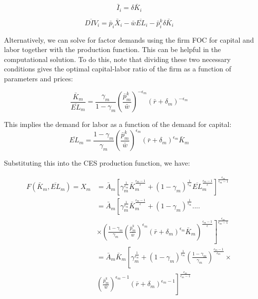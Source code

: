 \documentclass[letterpaper,12pt]{article}
\theoremstyle{definition}
\begin{document}
\begin{spacing}{1.5}
\begin{equation}
\label{eqn:i_ss2}
\bar{I}_{i} = \delta \bar{K}_{i}
\end{equation}

\begin{equation}
\label{eqn:div_ss}
\overline{DIV}_{i} = \bar{p}_{i}\bar{X}_{i}-\bar{w}\overline{EL}_{i}-\bar{p}^{k}_{i}\delta \bar{K}_{i}
\end{equation}


Alternatively, we can solve for factor demands using the firm FOC for capital and labor together with the production function.  This can be helpful in the computational solution.  To do this, note that dividing these two necessary conditions gives the optimal capital-labor ratio of the firm as a function of parameters and prices:

\begin{equation}
\frac{\bar{K}_{m}}{\overline{EL}_{m}} = \frac{\gamma_{m}}{1-\gamma_{m}}\left(\frac{\bar{p}^{k}_{m}}{\bar{w}} \right)^{-\epsilon_{m}}\left( \bar{r}+ \delta_{m}\right)^{-\epsilon_{m}}
\end{equation}

This implies the demand for labor as a function of the demand for capital:
\begin{equation}
\label{eqn:l_demand_dyn_ss}
\overline{EL}_{m} = \frac{1-\gamma_{m}}{\gamma_{m}}\left(\frac{\bar{p}^{k}_{m}}{\bar{w}} \right)^{\epsilon_{m}}\left( \bar{r}+ \delta_{m}\right)^{\epsilon_{m}}\bar{K}_{m}
\end{equation}

Substituting this into the CES production function, we have:

\begin{equation}
\begin{split}
F(\bar{K}_{m},\overline{EL}_{m})=X_{m} & = \bar{A}_{m}\left[\gamma_{m}^{\frac{1}{\epsilon_{m}}}\bar{K}_{m}^{\frac{\epsilon_{m}-1}{\epsilon}} + (1-\gamma_{m})^{\frac{1}{\epsilon_{m}}}\overline{EL}_{m}^{\frac{\epsilon_{m}-1}{\epsilon}} \right]^{\frac{\epsilon_{m}}{\epsilon_{m}-1}} \\
& = \bar{A}_{m}\left[\gamma_{m}^{\frac{1}{\epsilon_{m}}}\bar{K}_{m}^{\frac{\epsilon_{m}-1}{\epsilon}} + (1-\gamma_{m})^{\frac{1}{\epsilon_{m}}}.... \right. \\
& \left. \times \left(\frac{1-\gamma_{m}}{\gamma_{m}}\left(\frac{\bar{p}^{k}_{m}}{\bar{w}} \right)^{\epsilon_{m}}\left( \bar{r}+ \delta_{m}\right)^{\epsilon_{m}}\bar{K}_{m}\right)^{\frac{\epsilon_{m}-1}{\epsilon}} \right]^{\frac{\epsilon_{m}}{\epsilon_{m}-1}}  \\
& = \bar{A}_{m}\bar{K}_{m}\left[\gamma_{m}^{\frac{1}{\epsilon_{m}}} + (1-\gamma_{m})^{\frac{1}{\epsilon_{m}}} \left(\frac{1-\gamma_{m}}{\gamma_{m}}\right)^{\frac{\epsilon_{m}-1}{\epsilon_{m}}} \times \right. \\
& \left.  \left(\frac{\bar{p}^{k}_{m}}{\bar{w}} \right)^{\epsilon_{m}-1}\left( \bar{r}+\delta_{m}\right)^{\epsilon_{m}-1}  \right]^{\frac{\epsilon_{m}}{\epsilon_{m}-1}}
\end{split}
\end{equation}


\end{spacing}
\end{document}
